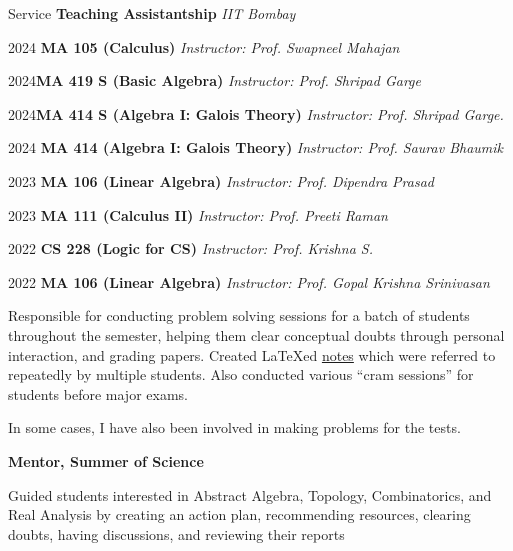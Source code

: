 
\begin{rubric}{Service}
	\entry*[2022--2024] \textbf{Teaching Assistantship} \hfill \emph{IIT Bombay}

	   2024 \quad \textbf{MA 105 (Calculus)} \hfill \emph{Instructor: Prof. Swapneel Mahajan}

	   2024\quad \textbf{MA 419 S (Basic Algebra)} \hfill \emph{Instructor: Prof. Shripad Garge}

	   2024\quad \textbf{MA 414 S (Algebra I: Galois Theory)} \hfill \emph{Instructor: Prof. Shripad Garge.}

	   2024 \quad \textbf{MA 414 (Algebra I: Galois Theory)} \hfill  \emph{Instructor: Prof. Saurav Bhaumik}

	   2023 \quad \textbf{MA 106 (Linear Algebra)} \hfill \emph{Instructor: Prof. Dipendra Prasad}

	   2023 \quad \textbf{MA 111 (Calculus II)} \hfill \emph{Instructor: Prof. Preeti Raman}
	   
	   2022 \quad \textbf{CS 228 (Logic for CS)} \hfill  \emph{Instructor: Prof. Krishna S.}
	   
	   2022 \quad \textbf{MA 106 (Linear Algebra)} \hfill \emph{Instructor: Prof. Gopal Krishna Srinivasan}

	    Responsible for conducting problem solving sessions for a batch of students throughout the semester, helping them clear conceptual doubts through personal interaction, and grading papers. 
		Created \LaTeX ed \href{https://swayamchube.github.io/notes}{notes} which were referred to repeatedly by multiple students. Also conducted various ``cram sessions'' for students before major exams.

		In some cases, I have also been involved in making problems for the tests.

	\entry*[2023, 2024] \textbf{Mentor, Summer of Science}

		Guided students interested in Abstract Algebra, Topology, Combinatorics, and Real Analysis by creating an action plan, recommending resources, clearing doubts, having discussions, and reviewing their reports	
\end{rubric}